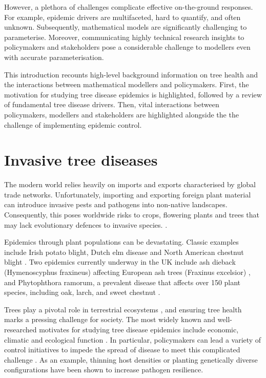 However, a plethora of challenges complicate effective on-the-ground responses. 
For example, epidemic drivers are multifaceted, hard to quantify, and often unknown. 
Subsequently, mathematical models are significantly challenging to parameterise. Moreover, communicating
highly technical research insights to policymakers and stakeholders pose a considerable challenge
to modellers even with accurate parameterisation. 

This introduction recounts high-level background information on tree health and the interactions
between mathematical modellers and policymakers.
First, the motivation for studying tree disease epidemics is highlighted, 
followed by a review of fundamental tree disease drivers.
Then, vital interactions between policymakers, modellers and stakeholders are highlighted alongside the
the challenge of implementing epidemic control.

\newpage

\section{Invasive tree diseases}

The modern world relies heavily on imports and exports characterised by global trade networks. 
Unfortunately, importing and exporting foreign plant material can introduce invasive pests and pathogens
into non-native landscapes. Consequently, this poses worldwide risks to crops, flowering plants
and trees that may lack evolutionary defences to invasive species. \cite{doi:10.1002/9781444329988.ch8}. 

Epidemics through plant populations can be devastating.
Classic examples include Irish potato blight, Dutch elm disease \cite{doi:10.1111/j.1365-3059.2010.02391.x} 
and North American chestnut blight \cite{doi:10.1002/9780470535486.ch7}.
Two epidemics currently underway in the UK include ash dieback (Hymenoscyphus fraxineus) affecting European ash trees (Fraxinus excelsior)
\cite{ash-dieback-costs}, and Phytophthora ramorum, a prevalent disease that affects over 150 plant species, including oak, 
larch, and sweet chestnut \cite{p.ramourum}.

Trees play a pivotal role in terrestrial ecosystems \cite{boyd2013consequence}, 
and ensuring tree health marks a pressing challenge for society.
The most widely known and well-researched motivates for studying tree disease epidemics include economic,
climatic and ecological function \cite{ash-dieback-costs, freer2017tree, boyd2013consequence, tyrvainen2005benefits}. 
In particular, policymakers can lead a variety of control initiatives to impede the spread of disease 
to meet this complicated challenge \cite{pests-intro, Gilligan-disease-management}. 
As an example, thinning host densities \cite{resiliency-density-reductions} or planting genetically diverse configurations
\cite{doi:10.1094/PD-89-0969, genetic-heterogeneity, huang1980importance} have been shown to increase
pathogen resilience. 

